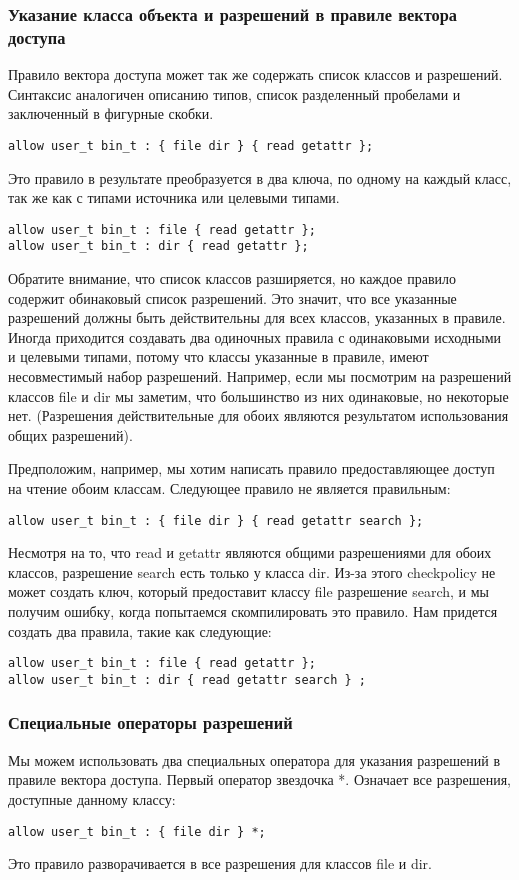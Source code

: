 \documentclass{./../class/UIR}
\begin{document}
\subsubsection{Указание класса объекта и разрешений в правиле вектора доступа}
    Правило вектора доступа может так же содержать список классов и разрешений.
    Синтаксис аналогичен описанию типов, список разделенный пробелами и
    заключенный в фигурные скобки.
\begin{verbatim}
allow user_t bin_t : { file dir } { read getattr };
\end{verbatim}
    Это правило в результате преобразуется в два ключа, по одному на каждый
    класс, так же как с типами источника или целевыми типами.
\begin{verbatim}
allow user_t bin_t : file { read getattr };
allow user_t bin_t : dir { read getattr };
\end{verbatim}
    Обратите внимание, что список классов разширяется, но каждое правило
    содержит обинаковый список разрешений. Это значит, что все указанные
    разрешений должны быть действительны для всех классов, указанных в правиле.
    Иногда приходится создавать два одиночных правила с одинаковыми исходными и
    целевыми типами, потому что классы указанные в правиле, имеют несовместимый
    набор разрешений. Например, если мы посмотрим на разрешений классов file и
    dir мы заметим, что большинство из них одинаковые, но некоторые нет.
    (Разрешения действительные для обоих являются результатом использования
    общих разрешений).

    Предположим, например, мы хотим написать правило предоставляющее доступ на
    чтение обоим классам. Следующее правило не является правильным:
\begin{verbatim}
allow user_t bin_t : { file dir } { read getattr search };
\end{verbatim}
    Несмотря на то, что read и getattr являются общими разрешениями для обоих
    классов, разрешение search есть только у класса dir. Из-за этого checkpolicy
    не может создать ключ, который предоставит классу file разрешение search, и
    мы получим ошибку, когда попытаемся скомпилировать это правило. Нам придется
    создать два правила, такие как следующие:
\begin{verbatim}
allow user_t bin_t : file { read getattr };
allow user_t bin_t : dir { read getattr search } ;
\end{verbatim}
\subsubsection{Специальные операторы разрешений}
    Мы можем использовать два специальных оператора для указания разрешений в
    правиле вектора доступа. Первый оператор звездочка *. Означает все
    разрешения, доступные данному классу:
\begin{verbatim}
allow user_t bin_t : { file dir } *;
\end{verbatim}
    Это правило разворачивается в все разрешения для классов file и dir.
\end{document}
